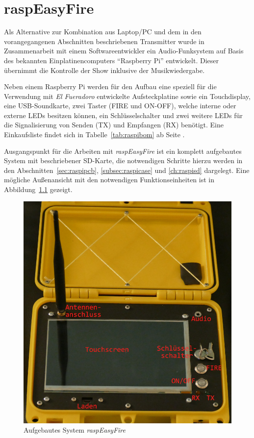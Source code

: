 \documentclass[paper=a4, parskip, numbers=noenddot, toc=listof, headsepline]{scrbook}
\newcommand{\anlage}{\emph{El Fueradoro}}
\newcommand{\REF}{\emph{raspEasyFire}}
\begin{document}
	\chapter{raspEasyFire}
	\label{ch:raspeasyfire}

		Als Alternative zur Kombination aus Laptop/PC und dem in den vorangegangenen Abschnitten beschriebenen Transmitter wurde in Zusammenarbeit mit einem Softwareentwickler ein Audio-Funksystem auf Basis des bekannten Einplatinencomputers \enquote{Raspberry Pi} entwickelt. Dieser übernimmt die Kontrolle der Show inklusive der Musikwiedergabe.

		Neben einem Raspberry Pi werden für den Aufbau eine speziell für die Verwendung mit {\anlage} entwickelte Aufsteckplatine sowie ein Touchdisplay, eine USB-Soundkarte, zwei Taster (FIRE und ON-OFF), welche interne oder externe LEDs besitzen können, ein Schlüsselschalter und zwei weitere LEDs für die Signalisierung von Senden (TX) und Empfangen (RX) benötigt. Eine Einkaufsliste findet sich in Tabelle~\ref{tab:raspibom} ab Seite \pageref{tab:raspibom}.

		Ausgangspunkt für die Arbeiten mit {\REF} ist ein komplett aufgebautes System mit beschriebener SD-Karte, die notwendigen Schritte hierzu werden in den Abschnitten~\ref{sec:raspipcb}, \ref{subsec:raspicase} und \ref{ch:raspisd} dargelegt. Eine mögliche Außenansicht mit den notwendigen Funktionseinheiten ist in Abbildung~\ref{fig:raspEasyFireDescription} gezeigt.

		\begin{figure}
			\centering\includegraphics[width=150mm]{Bilder/raspEasyFireDescription}
			\caption{Aufgebautes System \REF}
			\label{fig:raspEasyFireDescription}
		\end{figure}
\end{document}
